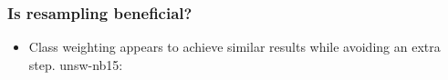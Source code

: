 \documentclass{beamer}
\newcommand{\Prob}{{\mathbb P}}
\begin{document}
\begin{frame}
\frametitle{Is resampling beneficial?}
\begin{itemize}
\item
Class weighting appears to achieve similar results while avoiding an extra step.
unsw-nb15:
\end{itemize}
\end{frame}
\end{document}
